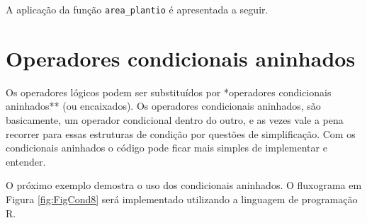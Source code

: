 \documentclass[
  11pt,
  a5paper,
  openany]{book}
\newenvironment{Shaded}{\begin{snugshade}}{\end{snugshade}}
\newcommand{\CommentTok}[1]{\textcolor[rgb]{0.56,0.35,0.01}{\textit{#1}}}
\newcommand{\DecValTok}[1]{\textcolor[rgb]{0.00,0.00,0.81}{#1}}
\newcommand{\KeywordTok}[1]{\textcolor[rgb]{0.13,0.29,0.53}{\textbf{#1}}}
\newcommand{\NormalTok}[1]{#1}
\newcommand{\StringTok}[1]{\textcolor[rgb]{0.31,0.60,0.02}{#1}}
\begin{document}
A aplicação da função \texttt{area\_plantio} é apresentada a seguir.

\begin{Shaded}
\end{Shaded}

\hypertarget{operadores-condicionais-aninhados}{%
\section{Operadores condicionais aninhados}\label{operadores-condicionais-aninhados}}

Os operadores lógicos podem ser substituídos por *operadores condicionais aninhados** (ou encaixados). Os operadores condicionais aninhados, são basicamente, um operador condicional dentro do outro, e as vezes vale a pena recorrer para essas estruturas de condição por questões de simplificação. Com os condicionais aninhados o código pode ficar mais simples de implementar e entender.

O próximo exemplo demostra o uso dos condicionais aninhados. O fluxograma em Figura \ref{fig:FigCond8} será implementado utilizando a linguagem de programação R.
\end{document}
